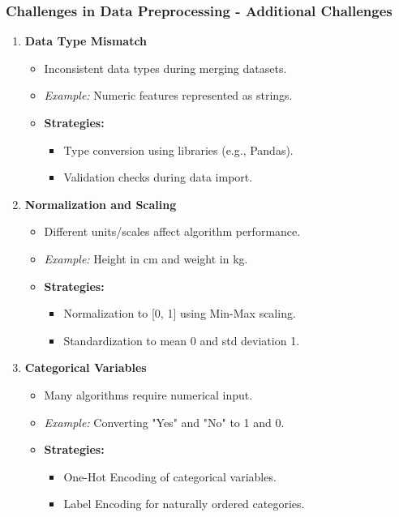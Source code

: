 \documentclass[aspectratio=169]{beamer}
\begin{document}
\begin{frame}[fragile]
    \frametitle{Challenges in Data Preprocessing - Additional Challenges}
    \begin{enumerate}[resume]
        \item \textbf{Data Type Mismatch}
        \begin{itemize}
            \item Inconsistent data types during merging datasets.
            \item \textit{Example:} Numeric features represented as strings.
            \item \textbf{Strategies:}
            \begin{itemize}
                \item Type conversion using libraries (e.g., Pandas).
                \item Validation checks during data import.
            \end{itemize}
        \end{itemize}
        \item \textbf{Normalization and Scaling}
        \begin{itemize}
            \item Different units/scales affect algorithm performance.
            \item \textit{Example:} Height in cm and weight in kg.
            \item \textbf{Strategies:}
            \begin{itemize}
                \item Normalization to [0, 1] using Min-Max scaling.
                \item Standardization to mean 0 and std deviation 1.
            \end{itemize}
        \end{itemize}
        \item \textbf{Categorical Variables}
        \begin{itemize}
            \item Many algorithms require numerical input.
            \item \textit{Example:} Converting "Yes" and "No" to 1 and 0.
            \item \textbf{Strategies:}
            \begin{itemize}
                \item One-Hot Encoding of categorical variables.
                \item Label Encoding for naturally ordered categories.

\end{itemize}
\end{itemize}
\end{enumerate}
\end{frame}
\end{document}
